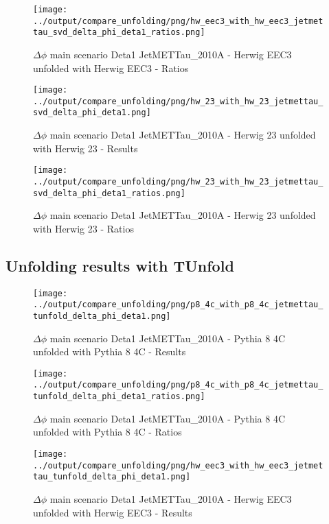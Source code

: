 \documentclass[11pt]{book}
\begin{document}
\begin{figure}[ht]
\centering
\texttt{[image: ../output/compare\_unfolding/png/hw\_eec3\_with\_hw\_eec3\_jetmettau\_svd\_delta\_phi\_deta1\_ratios.png]}
\caption{$\Delta\phi$ main scenario Deta1 JetMETTau\_2010A - Herwig EEC3 unfolded with Herwig EEC3 - Ratios}
\label{hw_eec3_hw_eec3_jetmettau_svd_delta_phi_deta1_b}
\end{figure}

\begin{figure}[ht]
\centering
\texttt{[image: ../output/compare\_unfolding/png/hw\_23\_with\_hw\_23\_jetmettau\_svd\_delta\_phi\_deta1.png]}
\caption{$\Delta\phi$ main scenario Deta1 JetMETTau\_2010A - Herwig 23 unfolded with Herwig 23 - Results}
\label{hw_23_hw_23_jetmettau_svd_delta_phi_deta1_a}
\end{figure}

\begin{figure}[ht]
\centering
\texttt{[image: ../output/compare\_unfolding/png/hw\_23\_with\_hw\_23\_jetmettau\_svd\_delta\_phi\_deta1\_ratios.png]}
\caption{$\Delta\phi$ main scenario Deta1 JetMETTau\_2010A - Herwig 23 unfolded with Herwig 23 - Ratios}
\label{hw_23_hw_23_jetmettau_svd_delta_phi_deta1_b}
\end{figure}


\clearpage
\subsection{Unfolding results with TUnfold}
\begin{figure}[ht]
\centering
\texttt{[image: ../output/compare\_unfolding/png/p8\_4c\_with\_p8\_4c\_jetmettau\_tunfold\_delta\_phi\_deta1.png]}
\caption{$\Delta\phi$ main scenario Deta1 JetMETTau\_2010A - Pythia 8 4C unfolded with Pythia 8 4C - Results}
\label{p8_p8_jetmettau_tunfold_delta_phi_deta1_a}
\end{figure}

\begin{figure}[ht]
\centering
\texttt{[image: ../output/compare\_unfolding/png/p8\_4c\_with\_p8\_4c\_jetmettau\_tunfold\_delta\_phi\_deta1\_ratios.png]}
\caption{$\Delta\phi$ main scenario Deta1 JetMETTau\_2010A - Pythia 8 4C unfolded with Pythia 8 4C - Ratios}
\label{p8_p8_jetmettau_tunfold_delta_phi_deta1_b}
\end{figure}

\begin{figure}[ht]
\centering
\texttt{[image: ../output/compare\_unfolding/png/hw\_eec3\_with\_hw\_eec3\_jetmettau\_tunfold\_delta\_phi\_deta1.png]}
\caption{$\Delta\phi$ main scenario Deta1 JetMETTau\_2010A - Herwig EEC3 unfolded with Herwig EEC3 - Results}
\label{hw_eec3_hw_eec3_jetmettau_tunfold_delta_phi_deta1_a}
\end{figure}
\end{document}
